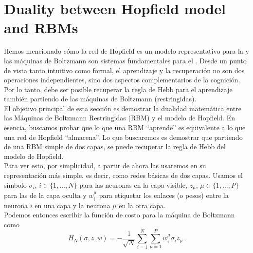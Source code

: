 \section{Duality between Hopfield model and RBMs}
\noindent
Hemos mencionado cómo la red de Hopfield es un modelo representativo para la  y las máquinas de Boltzmann son sistemas fundamentales para el . Desde un punto de vista tanto intuitivo como formal, el aprendizaje y la recuperación no son dos operaciones independientes, sino dos aspectos complementarios de la cognición. Por lo tanto, debe ser posible recuperar la regla de Hebb para el aprendizaje también partiendo de las máquinas de Boltzmann (restringidas). \\

\noindent
El objetivo principal de esta sección es demostrar la dualidad matemática entre las Máquinas de Boltzmann Restringidas (RBM) y el modelo de Hopfield. En esencia, buscamos probar que lo que una RBM ``aprende'' es equivalente a lo que una red de Hopfield ``almacena''.  Lo que buscaremos es demostrar que partiendo de una RBM simple de dos capas, se puede recuperar la regla de Hebb del modelo de Hopfield.  \\

\noindent
Para ver esto, por simplicidad, a partir de ahora las usaremos en su representación más simple, es decir, como redes básicas de dos capas. Usamos el símbolo $\sigma_i$, $i \in \{1, \ldots, N\}$ para las neuronas en la capa visible, $z_\mu$, $\mu \in \{1, \ldots, P\}$ para las de la capa oculta y $w_{i}^{\mu}$ para etiquetar los enlaces (o pesos) entre la neurona $i$ en una capa y la neurona $\mu$ en la otra capa.\\

\noindent
Podemos entonces escribir la función de costo para la máquina de Boltzmann como
\begin{equation*}
    H_N(\sigma, z, w) = -\frac{1}{\sqrt{N}} \sum_{i=1}^N \sum_{\mu=1}^P w_{i}^{\mu} \sigma_i z_\mu.
\end{equation*}

